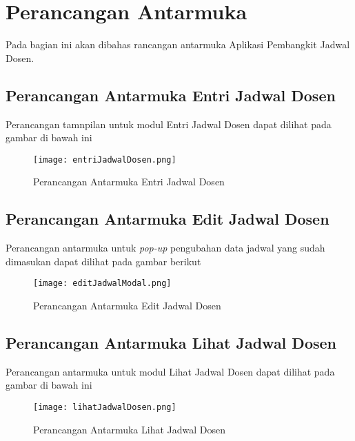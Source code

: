 \section{Perancangan Antarmuka}
Pada bagian ini akan dibahas rancangan antarmuka Aplikasi Pembangkit Jadwal Dosen.

\subsection{Perancangan Antarmuka Entri Jadwal Dosen}
Perancangan tamnpilan untuk modul Entri Jadwal Dosen dapat dilihat pada gambar di bawah ini
\begin{figure} [H]
	\centering  
	\texttt{[image: entriJadwalDosen.png]}
	\caption[Perancangan Antarmuka Entri Jadwal Dosen]{Perancangan Antarmuka Entri Jadwal Dosen} 
	\label{fig:flow-chart-CodeIgniter} 
\end{figure}
\subsection{Perancangan Antarmuka Edit Jadwal Dosen}
Perancangan antarmuka untuk \textit{pop-up} pengubahan data jadwal yang sudah dimasukan dapat dilihat pada gambar berikut
\begin{figure} [H]
	\centering  
	\texttt{[image: editJadwalModal.png]}
	\caption[Perancangan Antarmuka Edit Jadwal Dosen]{Perancangan Antarmuka Edit Jadwal Dosen} 
	\label{fig:flow-chart-CodeIgniter} 
\end{figure}
\subsection{Perancangan Antarmuka Lihat Jadwal Dosen}
Perancangan antarmuka untuk modul Lihat Jadwal Dosen dapat dilihat pada gambar di bawah ini
\begin{figure} [H]
	\centering  
	\texttt{[image: lihatJadwalDosen.png]}
	\caption[Perancangan Antarmuka Lihat Jadwal Dosen]{Perancangan Antarmuka Lihat Jadwal Dosen} 
	\label{fig:flow-chart-CodeIgniter} 
\end{figure}